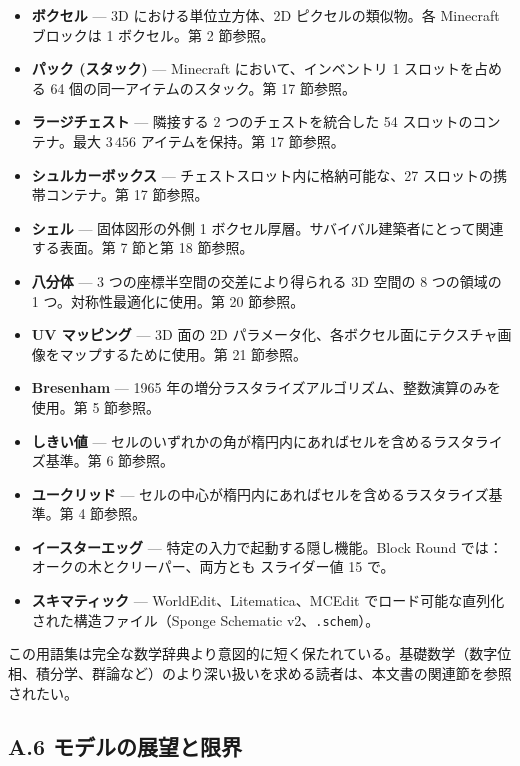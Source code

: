 \documentclass[12pt,a4paper]{scrartcl}
\newcommand{\code}[1]{\texttt{\small #1}}
\begin{document}
\begin{itemize}[leftmargin=1.4em,itemsep=0.18em,topsep=0.3em]
  \item \textbf{ボクセル} --- 3D における単位立方体、2D ピクセルの類似物。各 Minecraft ブロックは 1 ボクセル。第 2 節参照。
  \item \textbf{パック (スタック)} --- Minecraft において、インベントリ 1 スロットを占める 64 個の同一アイテムのスタック。第 17 節参照。
  \item \textbf{ラージチェスト} --- 隣接する 2 つのチェストを統合した 54 スロットのコンテナ。最大 $3\,456$ アイテムを保持。第 17 節参照。
  \item \textbf{シュルカーボックス} --- チェストスロット内に格納可能な、27 スロットの携帯コンテナ。第 17 節参照。
  \item \textbf{シェル} --- 固体図形の外側 1 ボクセル厚層。サバイバル建築者にとって関連する表面。第 7 節と第 18 節参照。
  \item \textbf{八分体} --- 3 つの座標半空間の交差により得られる 3D 空間の 8 つの領域の 1 つ。対称性最適化に使用。第 20 節参照。
  \item \textbf{UV マッピング} --- 3D 面の 2D パラメータ化、各ボクセル面にテクスチャ画像をマップするために使用。第 21 節参照。
  \item \textbf{Bresenham} --- 1965 年の増分ラスタライズアルゴリズム、整数演算のみを使用。第 5 節参照。
  \item \textbf{しきい値} --- セルのいずれかの角が楕円内にあればセルを含めるラスタライズ基準。第 6 節参照。
  \item \textbf{ユークリッド} --- セルの中心が楕円内にあればセルを含めるラスタライズ基準。第 4 節参照。
  \item \textbf{イースターエッグ} --- 特定の入力で起動する隠し機能。Block Round では：オークの木とクリーパー、両方とも スライダー値 15 で。
  \item \textbf{スキマティック} --- WorldEdit、Litematica、MCEdit でロード可能な直列化された構造ファイル（Sponge Schematic v2、\code{.schem}）。
\end{itemize}

この用語集は完全な数学辞典より意図的に短く保たれている。基礎数学（数字位相、積分学、群論など）のより深い扱いを求める読者は、本文書の関連節を参照されたい。

\subsection*{A.6 モデルの展望と限界}
\end{document}
